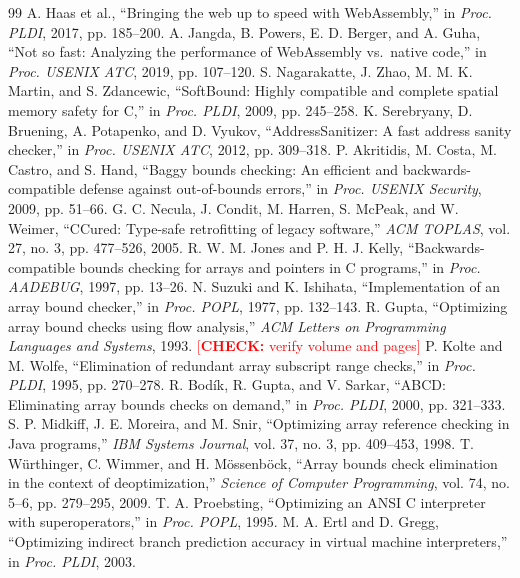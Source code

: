 \documentclass[11pt,a4paper]{article}
\newcommand{\todo}[1]{\textcolor{red}{[\textbf{CHECK:} #1]}}
\begin{document}
\begin{thebibliography}{99}\small
{} A. Haas et al., ``Bringing the web up to speed with WebAssembly,'' in \emph{Proc. PLDI}, 2017, pp. 185--200.
 A. Jangda, B. Powers, E. D. Berger, and A. Guha, ``Not so fast: Analyzing the performance of WebAssembly vs.\ native code,'' in \emph{Proc. USENIX ATC}, 2019, pp. 107--120.
 S. Nagarakatte, J. Zhao, M. M. K. Martin, and S. Zdancewic, ``SoftBound: Highly compatible and complete spatial memory safety for C,'' in \emph{Proc. PLDI}, 2009, pp. 245--258.
 K. Serebryany, D. Bruening, A. Potapenko, and D. Vyukov, ``AddressSanitizer: A fast address sanity checker,'' in \emph{Proc. USENIX ATC}, 2012, pp. 309--318.
 P. Akritidis, M. Costa, M. Castro, and S. Hand, ``Baggy bounds checking: An efficient and backwards-compatible defense against out-of-bounds errors,'' in \emph{Proc. USENIX Security}, 2009, pp. 51--66.
 G. C. Necula, J. Condit, M. Harren, S. McPeak, and W. Weimer, ``CCured: Type-safe retrofitting of legacy software,'' \emph{ACM TOPLAS}, vol. 27, no. 3, pp. 477--526, 2005.
 R. W. M. Jones and P. H. J. Kelly, ``Backwards-compatible bounds checking for arrays and pointers in C programs,'' in \emph{Proc. AADEBUG}, 1997, pp. 13--26.
 N. Suzuki and K. Ishihata, ``Implementation of an array bound checker,'' in \emph{Proc. POPL}, 1977, pp. 132--143.
 R. Gupta, ``Optimizing array bound checks using flow analysis,'' \emph{ACM Letters on Programming Languages and Systems}, 1993. \todo{verify volume and pages}
 P. Kolte and M. Wolfe, ``Elimination of redundant array subscript range checks,'' in \emph{Proc. PLDI}, 1995, pp. 270--278.
 R. Bod\'ik, R. Gupta, and V. Sarkar, ``ABCD: Eliminating array bounds checks on demand,'' in \emph{Proc. PLDI}, 2000, pp. 321--333.
 S. P. Midkiff, J. E. Moreira, and M. Snir, ``Optimizing array reference checking in Java programs,'' \emph{IBM Systems Journal}, vol. 37, no. 3, pp. 409--453, 1998.
 T. W\"urthinger, C. Wimmer, and H. M\"ossenb\"ock, ``Array bounds check elimination in the context of deoptimization,'' \emph{Science of Computer Programming}, vol. 74, no. 5--6, pp. 279--295, 2009.
 T. A. Proebsting, ``Optimizing an ANSI C interpreter with superoperators,'' in \emph{Proc. POPL}, 1995.
 M. A. Ertl and D. Gregg, ``Optimizing indirect branch prediction accuracy in virtual machine interpreters,'' in \emph{Proc. PLDI}, 2003.

\end{thebibliography}
\end{document}
